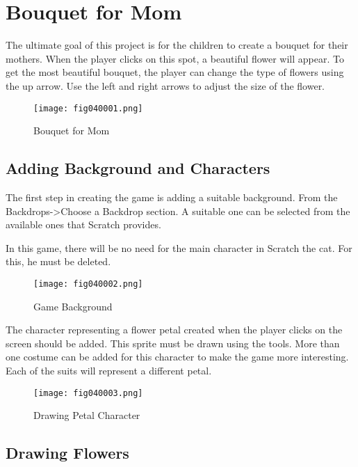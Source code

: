 \chapter{Bouquet for Mom}

The ultimate goal of this project is for the children to create a bouquet for their mothers. When the player clicks on this spot, a beautiful flower will appear. To get the most beautiful bouquet, the player can change the type of flowers using the up arrow. Use the left and right arrows to adjust the size of the flower.

\begin{figure}[H]
   \centering
   \texttt{[image: fig040001.png]}
   \caption{Bouquet for Mom}
\label{fig040001}
\end{figure}

\section{Adding Background and Characters}
The first step in creating the game is adding a suitable background. From the Backdrops->Choose a Backdrop section. A suitable one can be selected from the available ones that Scratch provides.

In this game, there will be no need for the main character in Scratch the cat. For this, he must be deleted.

\begin{figure}[H]
   \centering
   \texttt{[image: fig040002.png]}
   \caption{Game Background}
\label{fig040002}
\end{figure}

The character representing a flower petal created when the player clicks on the screen should be added. This sprite must be drawn using the tools. More than one costume can be added for this character to make the game more interesting. Each of the suits will represent a different petal.

\begin{figure}[H]
   \centering
   \texttt{[image: fig040003.png]}
   \caption{Drawing Petal Character}
\label{fig040003}
\end{figure}

\section{Drawing Flowers}

